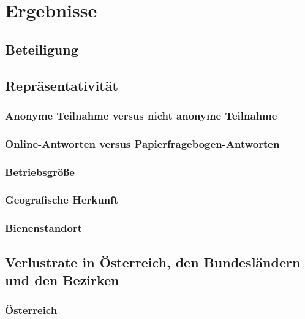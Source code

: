 \section{Ergebnisse}

\subsection{Beteiligung}

\blindtext

\subsection{Repräsentativität}
\subsubsection{Anonyme Teilnahme versus nicht anonyme Teilnahme}

\blindtext

\subsubsection{Online-Antworten versus Papierfragebogen-Antworten}

\blindtext

\subsubsection{Betriebsgröße}

\blindtext

\subsubsection{Geografische Herkunft}

\blindtext

\subsubsection{Bienenstandort}

\blindtext

\subsection{Verlustrate in Österreich, den Bundesländern und den Bezirken}
\subsubsection{Österreich}

